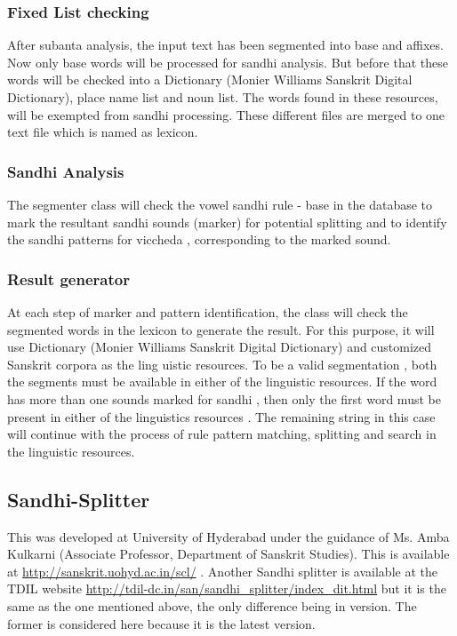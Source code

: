 \documentclass[11pt]{article}
\begin{document}
\subsubsection{Fixed List checking}
	After  subanta analysis, the input text has been segmented into base and affixes. Now only  base  words  will  be  processed  for  sandhi analysis.  But  before  that  these  words  will  be  checked  into  a Dictionary (Monier Williams Sanskrit Digital Dictionary),  place  name  list  and  noun  list.  The  words  found  in  these  resources, will  be exempted  from  sandhi processing. These different files are  merged to  one text file which is named as lexicon.
	
\subsubsection{Sandhi Analysis}
The segmenter class will check the  vowel sandhi rule - base in the database to mark the resultant  sandhi sounds  (marker)  for  potential  splitting  and  to  identify  the  sandhi patterns  for  viccheda , corresponding to the marked sound. 


\subsubsection{Result generator}
	At  each  step  of  marker  and  pattern  identification,  the  class  will  check  the  segmented  words  in  the  lexicon  to  generate  the  result.  For  this  purpose,  it  will  use  Dictionary (Monier Williams Sanskrit Digital Dictionary)  and  customized Sanskrit corpora as the ling uistic resources. To be a valid segmentation , both  the segments must be available in either of the linguistic resources. If the word has more  than one sounds marked for  sandhi , then only the first word must be present in either of  the linguistics resources . The remaining string in this case will continue with the process  of rule pattern matching, splitting and search in the linguistic resources.


\subsection{Sandhi-Splitter} This was developed at University of Hyderabad under the guidance of Ms. Amba Kulkarni (Associate Professor, Department of Sanskrit Studies). This is available at \url{http://sanskrit.uohyd.ac.in/scl/}  . 
Another Sandhi splitter is available at the TDIL website 
\url{http://tdil-dc.in/san/sandhi_splitter/index_dit.html}  but it is the same as the one mentioned above, the only difference being in version. The former is considered here because it is the latest version.
\end{document}

